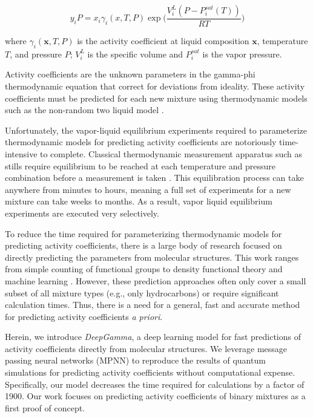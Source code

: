 \begin{equation}
    \label{gamma-phi}
    y_i P = x_i \gamma_i(x,T,P)   \exp \biggl(\frac{V_i^L(P-P_i^{sat}(T))}{RT}\biggr)
\end{equation}

where $\gamma_i(\mathbf x,T,P)$ is the activity coefficient at liquid composition $\mathbf x$,  temperature $T$, and pressure $P$; $V_i^L$ is the specific volume and $P_i^{sat}$ is the vapor pressure.  

Activity coefficients are the unknown parameters in the gamma-phi thermodynamic equation that correct for deviations from ideality. These activity coefficients must be predicted for each new mixture using thermodynamic models such as the non-random two liquid model \cite{Renon1968}. 

Unfortunately, the vapor-liquid equilibrium experiments required to parameterize thermodynamic models for predicting activity coefficients are notoriously time-intensive to complete. Classical thermodynamic measurement apparatus such as stills require equilibrium to be reached at each temperature and pressure combination before a measurement is taken \cite{Ronc1976, Dechambre2014}. This equilibration process can take anywhere from minutes to hours, meaning a full set of experiments for a new mixture can take weeks to months. As a result, vapor liquid equilibrium experiments are executed very selectively.

To reduce the time required for parameterizing thermodynamic models for predicting activity coefficients, there is a large body of research focused on directly predicting the parameters from molecular structures. This work ranges from simple counting of functional groups \cite{Fredenslund1975} to density functional theory \cite{ Klamt2010} and machine learning \cite{Urata2002, Nami2011,  Jirasek2020}.  However, these prediction approaches often only cover a small subset of all mixture types (e.g., only hydrocarbons) or require significant calculation times. Thus, there is a need for a general, fast and accurate method for predicting activity coefficients \textit{a priori}.

Herein, we introduce \textit{DeepGamma}, a deep learning model for fast predictions of activity coefficients directly from molecular structures.  We leverage  message passing neural networks (MPNN) to reproduce the results of quantum simulations for predicting activity coefficients without computational expense. Specifically, our model decreases the time required for calculations by a factor of 1900. Our work focuses on predicting activity coefficients of binary mixtures as a first proof of concept. 

